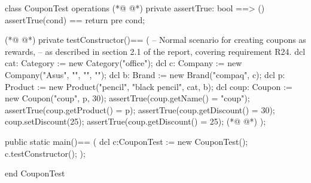 \begin{vdmpp}[breaklines=true]
class CouponTest
 operations
(*@
\label{assertTrue:3}
@*)
  private assertTrue: bool ==> ()
    assertTrue(cond) == return
    pre cond;
    
(*@
\label{testConstructor:7}
@*)
  private testConstructor()==
  (
    -- Normal scenario for creating coupons as rewards,
     -- as described in section 2.1 of the report, covering requirement R24.
    dcl cat: Category := new Category("office");
   dcl c: Company := new Company("Asus", "", "", "");
   dcl b: Brand := new Brand("compaq", c);
    dcl p: Product := new Product("pencil", "black pencil", cat, b);
   dcl coup: Coupon := new Coupon("coup", p, 30);
   assertTrue(coup.getName() = "coup");
   assertTrue(coup.getProduct() = p);
   assertTrue(coup.getDiscount() = 30);
   coup.setDiscount(25);
   assertTrue(coup.getDiscount() = 25);
(*@
\label{main:21}
@*)
  );
 
  public static main()==
    (
   dcl c:CouponTest := new CouponTest();
   c.testConstructor();
    );

end CouponTest
\end{vdmpp}
